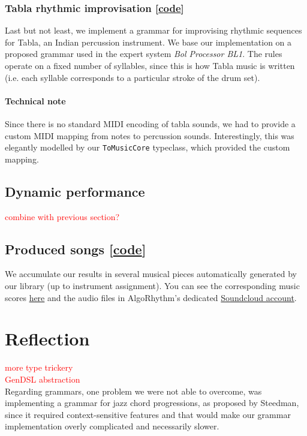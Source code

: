 \documentclass[11pt,a4paper]{article}
\newcommand{\icode}[1]{\texttt{#1}}
\newcommand\todo[1]{\textcolor{red}{#1}}
\begin{document}
\subsubsection{Tabla rhythmic improvisation [\href{https://github.com/omelkonian/AlgoRhythm/blob/master/AlgoRhythm/src/Grammar/Tabla.hs}{code}]}
Last but not least, we implement a grammar for improvising rhythmic sequences for Tabla, an Indian percussion instrument. We base our implementation on a proposed grammar used in the expert system \textit{Bol Processor BL1}\cite{tabla}. The rules operate on a fixed number of syllables, since this is how Tabla music is written (i.e. each syllable corresponds to a particular stroke of the drum set).\vspace{-3mm}
\paragraph{Technical note} Since there is no standard MIDI encoding of tabla sounds, we had to provide a custom MIDI mapping from notes to percussion sounds. Interestingly, this was elegantly modelled by our \icode{ToMusicCore} typeclass, which provided the custom mapping.

\subsection{Dynamic performance}
\todo{combine with previous section?}

\subsection{Produced songs [\href{https://github.com/omelkonian/AlgoRhythm/blob/master/AlgoRhythm/app/Main.hs}{code}]} We accumulate our results in several musical pieces automatically generated by our library (up to instrument assignment). You can see the corresponding music scores \href{https://github.com/omelkonian/AlgoRhythm/tree/master/output}{here} and the audio files in AlgoRhythm's dedicated \href{https://soundcloud.com/algo-rhythm-haskell/sets}{Soundcloud account}.

\section{Reflection}
\todo{more type trickery}\\
\todo{GenDSL abstraction}\\

Regarding grammars, one problem we were not able to overcome, was implementing a grammar for jazz chord progressions, as proposed by Steedman\cite{jazzchords}, since it required context-sensitive features and that would make our grammar implementation overly complicated and necessarily slower.\\

\newpage


\end{document}
